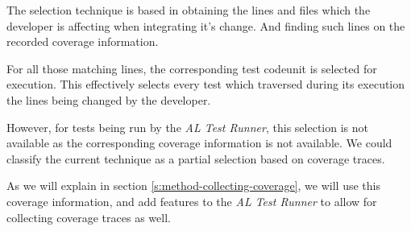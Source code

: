 The selection technique is based in obtaining the lines and files which the developer is
affecting when integrating it's change. And finding such lines on the recorded coverage information.

For all those matching lines, the corresponding test codeunit is selected for execution. This 
effectively selects every test which traversed during its execution the lines being changed
by the developer.

However, for tests being run by the \emph{AL Test Runner}, this selection is not available as the corresponding 
coverage information is not available. We could classify the current technique as a partial selection
based on coverage traces.

As we will explain in section \ref{s:method-collecting-coverage}, we will use this coverage 
information, and add features to the \emph{AL Test Runner} to allow for collecting coverage
traces as well.